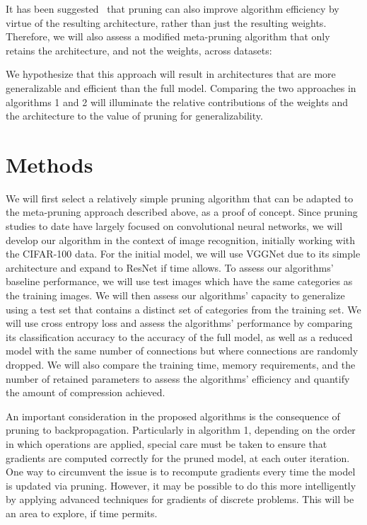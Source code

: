 \documentclass{article}
\begin{document}
It has been suggested~\citet{prune_for_architecture} that pruning can also improve algorithm efficiency by virtue of the resulting architecture, rather than just the resulting weights. Therefore, we will also assess a modified meta-pruning algorithm that only retains the architecture, and not the weights, across datasets:



We hypothesize that this approach will result in architectures that are more generalizable and efficient than the full model. Comparing the two approaches in algorithms 1 and 2 will illuminate the relative contributions of the weights and the architecture to the value of pruning for generalizability. 

\section{Methods}

We will first select a relatively simple pruning algorithm that can be adapted to the meta-pruning approach described above, as a proof of concept. Since pruning studies to date have largely focused on convolutional neural networks, we will develop our algorithm in the context of image recognition, initially working with the CIFAR-100 data. For the initial model, we will use VGGNet due to its simple architecture and expand to ResNet if time allows. To assess our algorithms' baseline performance, we will use test images which have the same categories as the training images. We will then assess our algorithms' capacity to generalize using a test set that contains a distinct set of categories from the training set. We will use cross entropy loss and assess the algorithms' performance by comparing its classification accuracy to the accuracy of the full model, as well as a reduced model with the same number of connections but where connections are randomly dropped. We will also compare the training time, memory requirements, and the number of retained parameters to assess the algorithms' efficiency and quantify the amount of compression achieved.

An important consideration in the proposed algorithms is the consequence of pruning to backpropagation. Particularly in algorithm 1, depending on the order in which operations are applied, special care must be taken to ensure that gradients are computed correctly for the pruned model, at each outer iteration. One way to circumvent the issue is to recompute gradients every time the model is updated via pruning. However, it may be possible to do this more intelligently by applying advanced techniques for gradients of discrete problems. This will be an area to explore, if time permits.
\end{document}

